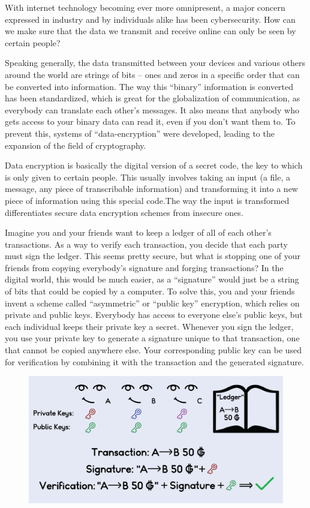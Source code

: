 With internet technology becoming ever more omnipresent, a major concern expressed in industry and by individuals alike has been cybersecurity. How can we make sure that the data we transmit and receive online can only be seen by certain people?

Speaking generally, the data transmitted between your devices and various others around the world are strings of bits – ones and zeros in a specific order that can be converted into information. The way this “binary” information is converted has been standardized, which is great for the globalization of communication, as everybody can translate each other’s messages. It also means that anybody who gets access to your binary data can read it, even if you don’t want them to. To prevent this, systems of “data-encryption” were developed, leading to the expansion of the field of cryptography.

Data encryption is basically the digital version of a secret code, the key to which is only given to certain people. This usually involves taking an input (a file, a message, any piece of transcribable information) and transforming it into a new piece of information using this special code.The way the input is transformed differentiates secure data encryption schemes from insecure ones.

Imagine you and your friends want to keep a ledger of all of each other’s transactions. As a way to verify each transaction, you decide that each party must sign the ledger. This seems pretty secure, but what is stopping one of your friends from copying everybody’s signature and forging transactions? In the digital world, this would be much easier, as a “signature” would just be a string of bits that could be copied by a computer. To solve this, you and your friends invent a scheme called “asymmetric” or “public key” encryption, which relies on  private and public keys. Everybody has access to everyone else’s public keys, but each individual keeps their private key a secret. Whenever you sign the ledger, you use your private key to generate a signature unique to that transaction, one that cannot be copied anywhere else. Your corresponding public key can be used for verification by combining it with the transaction and the generated signature. 


\begin{figure}[H]
    \centering \includegraphics*[scale=.25]{assets/cryptography.png}
\end{figure}


